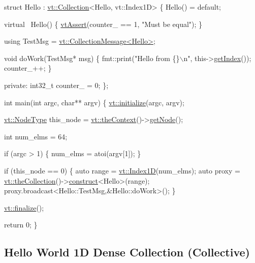 \begin{DoxyCodeInclude}
\textcolor{keyword}{struct }Hello : \hyperlink{structvt_1_1vrt_1_1collection_1_1_collection}{vt::Collection}<Hello, vt::Index1D> \{
  Hello() = \textcolor{keywordflow}{default};

  \textcolor{keyword}{virtual} ~Hello() \{
    \hyperlink{config__assert_8h_aeddd4990a496e91a0ca5d6c16437359b}{vtAssert}(counter\_ == 1, \textcolor{stringliteral}{"Must be equal"});
  \}

  \textcolor{keyword}{using} TestMsg = \hyperlink{structvt_1_1vrt_1_1collection_1_1_collection_message}{vt::CollectionMessage<Hello>};

  \textcolor{keywordtype}{void} doWork(TestMsg* msg) \{
    fmt::print(\textcolor{stringliteral}{"Hello from \{\}\(\backslash\)n"}, this->\hyperlink{structvt_1_1vrt_1_1collection_1_1_indexable_a28d05f23e7a20e12e94b8235305c1e82}{getIndex}());
    counter\_++;
  \}

\textcolor{keyword}{private}:
  int32\_t counter\_ = 0;
\};

\textcolor{keywordtype}{int} main(\textcolor{keywordtype}{int} argc, \textcolor{keywordtype}{char}** argv) \{
  \hyperlink{namespacevt_aaa266774ea8339c58be0202b00fafa62}{vt::initialize}(argc, argv);

  \hyperlink{namespacevt_a866da9d0efc19c0a1ce79e9e492f47e2}{vt::NodeType} this\_node = \hyperlink{namespacevt_a26551fe0e6e6a1371111df5b12c7e92c}{vt::theContext}()->\hyperlink{structvt_1_1ctx_1_1_context_a0d52c263ce8516546a67443d9a86fa5f}{getNode}();

  \textcolor{keywordtype}{int} num\_elms = 64;

  \textcolor{keywordflow}{if} (argc > 1) \{
    num\_elms = atoi(argv[1]);
  \}

  \textcolor{keywordflow}{if} (this\_node == 0) \{
    \textcolor{keyword}{auto} range = \hyperlink{namespacevt_a5540efc78234273e1796fb003fe4d234}{vt::Index1D}(num\_elms);
    \textcolor{keyword}{auto} proxy = \hyperlink{namespacevt_a1c45ce63bfd2c327ff7d76a319a371d8}{vt::theCollection}()->\hyperlink{structvt_1_1vrt_1_1collection_1_1_collection_manager_a4de84e9efd7a3948e3c20be549441cfd}{construct}<Hello>(range);
    proxy.broadcast<Hello::TestMsg,&Hello::doWork>();
  \}

  \hyperlink{namespacevt_a540d90dbd6e97b69f1dcbc9ee9314cff}{vt::finalize}();

  \textcolor{keywordflow}{return} 0;
\}
\end{DoxyCodeInclude}
 \hypertarget{collection_collective-hello-world-collection}{}\subsection{Hello World 1\+D Dense Collection (\+Collective)}\label{collection_collective-hello-world-collection}

